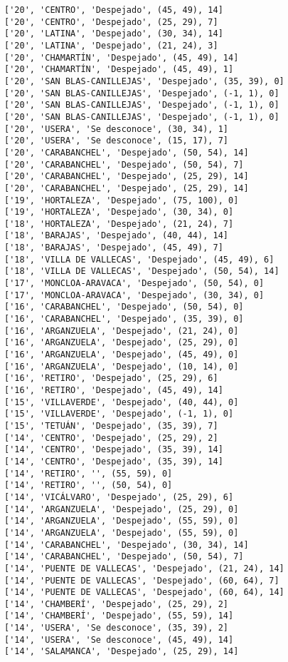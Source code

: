 \documentclass[11pt]{article}
\begin{document}
\begin{Verbatim}[commandchars=\\\{\}]
['20', 'CENTRO', 'Despejado', (45, 49), 14]
['20', 'CENTRO', 'Despejado', (25, 29), 7]
['20', 'LATINA', 'Despejado', (30, 34), 14]
['20', 'LATINA', 'Despejado', (21, 24), 3]
['20', 'CHAMARTÍN', 'Despejado', (45, 49), 14]
['20', 'CHAMARTÍN', 'Despejado', (45, 49), 1]
['20', 'SAN BLAS-CANILLEJAS', 'Despejado', (35, 39), 0]
['20', 'SAN BLAS-CANILLEJAS', 'Despejado', (-1, 1), 0]
['20', 'SAN BLAS-CANILLEJAS', 'Despejado', (-1, 1), 0]
['20', 'SAN BLAS-CANILLEJAS', 'Despejado', (-1, 1), 0]
['20', 'USERA', 'Se desconoce', (30, 34), 1]
['20', 'USERA', 'Se desconoce', (15, 17), 7]
['20', 'CARABANCHEL', 'Despejado', (50, 54), 14]
['20', 'CARABANCHEL', 'Despejado', (50, 54), 7]
['20', 'CARABANCHEL', 'Despejado', (25, 29), 14]
['20', 'CARABANCHEL', 'Despejado', (25, 29), 14]
['19', 'HORTALEZA', 'Despejado', (75, 100), 0]
['19', 'HORTALEZA', 'Despejado', (30, 34), 0]
['18', 'HORTALEZA', 'Despejado', (21, 24), 7]
['18', 'BARAJAS', 'Despejado', (40, 44), 14]
['18', 'BARAJAS', 'Despejado', (45, 49), 7]
['18', 'VILLA DE VALLECAS', 'Despejado', (45, 49), 6]
['18', 'VILLA DE VALLECAS', 'Despejado', (50, 54), 14]
['17', 'MONCLOA-ARAVACA', 'Despejado', (50, 54), 0]
['17', 'MONCLOA-ARAVACA', 'Despejado', (30, 34), 0]
['16', 'CARABANCHEL', 'Despejado', (50, 54), 0]
['16', 'CARABANCHEL', 'Despejado', (35, 39), 0]
['16', 'ARGANZUELA', 'Despejado', (21, 24), 0]
['16', 'ARGANZUELA', 'Despejado', (25, 29), 0]
['16', 'ARGANZUELA', 'Despejado', (45, 49), 0]
['16', 'ARGANZUELA', 'Despejado', (10, 14), 0]
['16', 'RETIRO', 'Despejado', (25, 29), 6]
['16', 'RETIRO', 'Despejado', (45, 49), 14]
['15', 'VILLAVERDE', 'Despejado', (40, 44), 0]
['15', 'VILLAVERDE', 'Despejado', (-1, 1), 0]
['15', 'TETUÁN', 'Despejado', (35, 39), 7]
['14', 'CENTRO', 'Despejado', (25, 29), 2]
['14', 'CENTRO', 'Despejado', (35, 39), 14]
['14', 'CENTRO', 'Despejado', (35, 39), 14]
['14', 'RETIRO', '', (55, 59), 0]
['14', 'RETIRO', '', (50, 54), 0]
['14', 'VICÁLVARO', 'Despejado', (25, 29), 6]
['14', 'ARGANZUELA', 'Despejado', (25, 29), 0]
['14', 'ARGANZUELA', 'Despejado', (55, 59), 0]
['14', 'ARGANZUELA', 'Despejado', (55, 59), 0]
['14', 'CARABANCHEL', 'Despejado', (30, 34), 14]
['14', 'CARABANCHEL', 'Despejado', (50, 54), 7]
['14', 'PUENTE DE VALLECAS', 'Despejado', (21, 24), 14]
['14', 'PUENTE DE VALLECAS', 'Despejado', (60, 64), 7]
['14', 'PUENTE DE VALLECAS', 'Despejado', (60, 64), 14]
['14', 'CHAMBERÍ', 'Despejado', (25, 29), 2]
['14', 'CHAMBERÍ', 'Despejado', (55, 59), 14]
['14', 'USERA', 'Se desconoce', (35, 39), 2]
['14', 'USERA', 'Se desconoce', (45, 49), 14]
['14', 'SALAMANCA', 'Despejado', (25, 29), 14]

\end{Verbatim}
\end{document}
